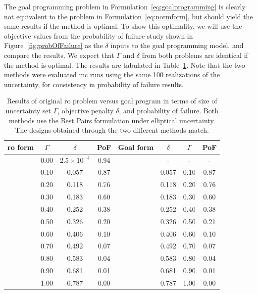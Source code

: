 The goal programming problem in Formulation~\ref{eq:goalprogramming} is clearly
not equivalent to the problem in Formulation~\ref{eq:normform},
but should yield the same results if the method is optimal.
To show this optimality, we will use the objective values from the probability of failure study
shown in Figure~\ref{fig:probOfFailure} as the $\delta$ inputs to the goal programming model, and compare the results.
We expect that $\Gamma$ and $\delta$  from both problems are identical if the method is optimal.
The results are tabulated in
Table~\ref{tab:deltaVsGamma}. Note that the two methods were evaluated \gls{mc} runs using the same 100 realizations
of the uncertainty, for consistency in probability of failure results.

\begin{table}
\begin{center}
\caption{\label{tab:deltaVsGamma} Results of original \gls{ro} problem versus goal program in terms
of size of uncertainty set $\Gamma$, objective penalty $\delta$, and probability of failure. Both methods
use the Best Pairs formulation under elliptical uncertainty. The designs obtained through
the two different methods match.}
\begin{tabular}{c c c c c c c c}
\hline
 \gls{ro} form & $\Gamma$ & $\delta$ & PoF & Goal form & $\delta$ & $\Gamma$ & PoF\\
\hline
& 0.00 & $2.5 \times 10^{-4}$ & 0.94 & & - & - & - \\
& 0.10 & 0.057 & 0.87 & & 0.057 & 0.10 & 0.87 \\
& 0.20 & 0.118 & 0.76 & & 0.118 & 0.20 & 0.76 \\
& 0.30 & 0.183 & 0.60 & & 0.183 & 0.30 & 0.60 \\
& 0.40 & 0.252 & 0.38 & & 0.252 & 0.40 & 0.38 \\
& 0.50 & 0.326 & 0.20 & & 0.326 & 0.50 & 0.21 \\
& 0.60 & 0.406 & 0.10 & & 0.406 & 0.60 & 0.10 \\
& 0.70 & 0.492 & 0.07 & & 0.492 & 0.70 & 0.07 \\
& 0.80 & 0.583 & 0.04 & & 0.583 & 0.80 & 0.04 \\
& 0.90 & 0.681 & 0.01 & & 0.681 & 0.90 & 0.01 \\
& 1.00 & 0.787 & 0.00 & & 0.787 & 1.00 & 0.00 \\
\end{tabular}
\end{center}
\end{table}

